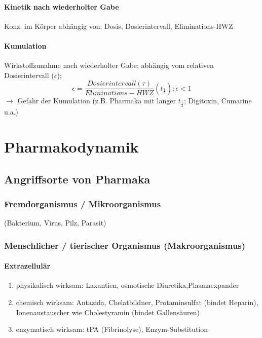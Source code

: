\documentclass[10pt,a4paper]{report}
\begin{document}
\subsubsection{Kinetik nach wiederholter Gabe}
Konz. im Körper abhängig von: Dosis, Dosierintervall, Eliminations-HWZ \\

\subsubsection{Kumulation}  Wirkstoffzunahme nach wiederholter Gabe; abhängig vom relativen Dosierintervall ($\epsilon$); 
\begin{equation}
	\epsilon=\frac{Dosierintervall(\tau)}{Eliminations-HWZ}(t_{\frac{1}{2}});\epsilon <1
\end{equation}
$\rightarrow$  Gefahr der Kumulation (z.B. Pharmaka mit langer $t_{\frac{1}{2}}$; Digitoxin, Cumarine u.a.) 

\chapter{Pharmakodynamik}

\section{Angriffsorte von Pharmaka}

\subsection{Fremdorganismus / Mikroorganismus}
(Bakterium, Virus, Pilz, Parasit)

\subsection{Menschlicher / tierischer Organismus (Makroorganismus)}

\subsubsection{Extrazellulär}

\begin{enumerate}
	\item physikalisch wirksam: Laxantien, osmotische 	Diuretika,Plasmaexpander
	\item chemisch wirksam: Antazida, Chelatbildner, Protaminsulfat (bindet Heparin), Ionenaustauscher wie Cholestyramin (bindet Gallensäuren)
	\item enzymatisch wirksam: tPA (Fibrinolyse), Enzym-Substitution
\end{enumerate}
\end{document}
